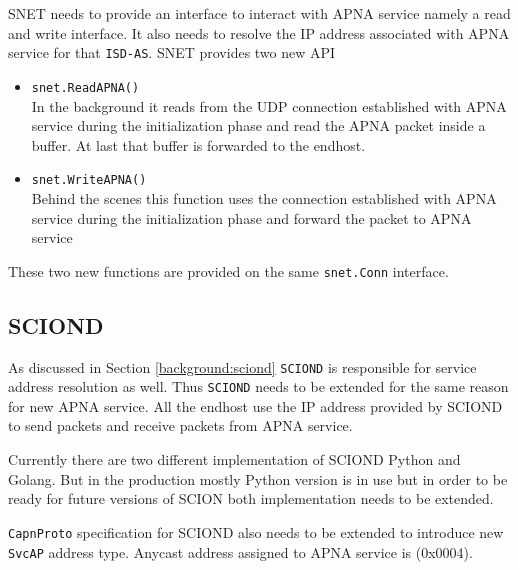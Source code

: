 SNET needs to provide an interface to interact with APNA service namely a read and write interface. It also needs to resolve the IP address associated with APNA service for that \texttt{ISD-AS}. SNET provides two new API
\begin{itemize}
    \item \texttt{snet.ReadAPNA()} \\
    In the background it reads from the UDP connection established with APNA service during the initialization phase and read the APNA packet inside a buffer. At last that buffer is forwarded to the endhost.
    \item \texttt{snet.WriteAPNA()} \\
    Behind the scenes this function uses the connection established with APNA service during the initialization phase and forward the packet to APNA service
\end{itemize}

These two new functions are provided on the same \texttt{snet.Conn} interface.

\subsection{SCIOND}
As discussed in Section \ref{background:sciond} \texttt{SCIOND} is responsible for service address resolution as well. Thus \texttt{SCIOND} needs to be extended for the same reason for new APNA service. All the endhost use the IP address provided by SCIOND to send packets and receive packets from APNA service.

Currently there are two different implementation of SCIOND Python and Golang. But in the production mostly Python version is in use but in order to be ready for future versions of SCION both implementation needs to be extended.

\texttt{CapnProto} specification for SCIOND also needs to be extended to introduce new \texttt{SvcAP} address type. Anycast address assigned to APNA service is (0x0004). 

